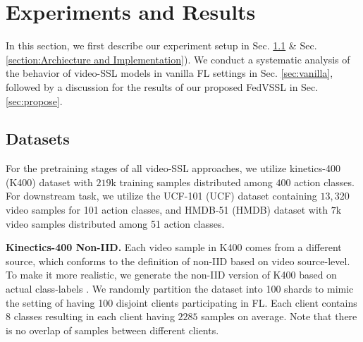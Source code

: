 \section{Experiments and Results}
In this section, we first describe our experiment setup in Sec. \ref{Dataset_decp} \& Sec. \ref{section:Archiecture and Implementation}). We conduct a systematic analysis of the behavior of video-SSL models in vanilla FL settings in Sec. \ref{sec:vanilla}, followed by a discussion for the results of our proposed FedVSSL in Sec. \ref{sec:propose}.

\subsection{Datasets}
\label{Dataset_decp}
For the pretraining stages of all video-SSL approaches, we utilize kinetics-400 (K400) dataset \cite{kay2017kinetics} with $219$k training samples distributed among $400$ action classes. For downstream task, we utilize the UCF-101 \cite{soomro2012ucf101} (UCF) dataset containing $13,320$ video samples for 101 action classes, and HMDB-51 \cite{Kuehne11} (HMDB) dataset with $7$k video samples distributed among 51 action classes.

\noindent\textbf{Kinectics-400 Non-IID.} Each video sample in K400 comes from a different source, which conforms to the definition of non-IID based on video source-level. To make it more realistic, we generate the non-IID version of K400 based on actual class-labels \cite{mcmahan2017communication}. 
We randomly partition the dataset into 100 shards to mimic the setting of having 100 disjoint clients participating in FL. Each client contains $8$ classes resulting in each client having $2285$ samples on average. Note that there is no overlap of samples between different clients. 


